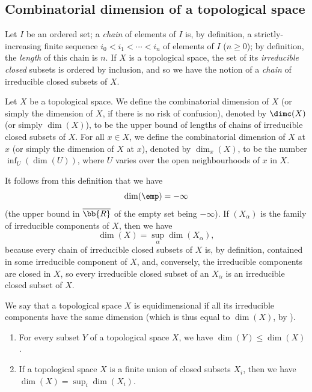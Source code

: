 \subsection{Combinatorial dimension of a topological space}
\label{subsection:0.14.1}

\begin{env}[14.1.1]
\label{0.14.1.1}
Let $I$ be an ordered set; a \emph{chain} of elements of $I$ is, by definition, a strictly-increasing finite sequence $i_0<i_1<\cdots<i_n$ of elements of $I$ ($n\geq 0$); by definition, the \emph{length} of this chain is $n$.
If $X$ is a topological space, the set of its \emph{irreducible closed} subsets is ordered by inclusion, and so we have the notion of a \emph{chain} of irreducible closed subsets of $X$.
\end{env}

\begin{definition}[14.1.2]
\label{0.14.1.2}
Let $X$ be a topological space.
We define the combinatorial dimension of $X$ (or simply the dimension of $X$, if there is no risk of confusion), denoted by $\dimc(X)$ (or simply $\dim(X)$), to be the upper bound of lengths of chains of irreducible closed subsets of $X$.
For all $x\in X$, we define the combinatorial dimension of $X$ at $x$ (or simply the dimension of $X$ at $x$), denoted by $\dim_x(X)$, to be the number $\inf_U(\dim(U))$, where $U$ varies over the open neighbourhoods of $x$ in $X$.
\end{definition}

It follows from this definition that we have
\[
  \dim(\emp)=-\infty
\]
(the upper bound in $\overline{\bb{R}}$ of the empty set being $-\infty$).
If $(X_\alpha)$ is the family of irreducible components of $X$, then we have
\[
\label{0.14.1.2.1}
  \dim(X)=\sup_\alpha\dim(X_\alpha),
  \tag{14.1.2.1}
\]
because every chain of irreducible closed subsets of $X$ is, by definition, contained in some irreducible component of $X$, and, conversely, the irreducible components are closed in $X$, so every irreducible closed subset of an $X_\alpha$ is an irreducible closed subset of $X$.

\begin{definition}[14.1.3]
\label{0.14.1.3}
We say that a topological space $X$ is equidimensional if all its irreducible components have the same dimension (which is thus equal to $\dim(X)$, by ).
\end{definition}

\begin{proposition}[14.1.4]
\label{0.14.1.4}
\medskip\noindent
\begin{enumerate}
  \item[{\rm(i)}] For every subset $Y$ of a topological space $X$, we have $\dim(Y)\leq\dim(X)$.
  \item[{\rm(ii)}] If a topological space $X$ is a finite union of closed subsets $X_i$, then we have $\dim(X)=\sup_i\dim(X_i)$.
\end{enumerate}
\end{proposition}

